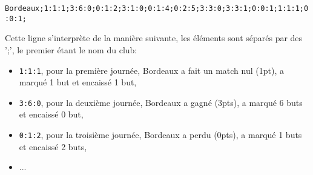 \verb?Bordeaux;1:1:1;3:6:0;0:1:2;3:1:0;0:1:4;0:2:5;3:3:0;3:3:1;0:0:1;1:1:1;0:0:1;?

Cette ligne s'interprète de la manière suivante, les éléments sont séparés par des ';', le premier étant le nom du club:
\begin{itemize}
 \item \verb?1:1:1?, pour la première journée, Bordeaux a fait un match nul (1pt), a marqué 1 but et encaissé 1 but,
 \item \verb?3:6:0?, pour la deuxième journée, Bordeaux a gagné (3pts), a marqué 6 buts et encaissé 0 but,
 \item \verb?0:1:2?, pour la troisième journée, Bordeaux a perdu (0pts), a marqué 1 buts et encaissé 2 buts,
 \item ... 
\end{itemize}

